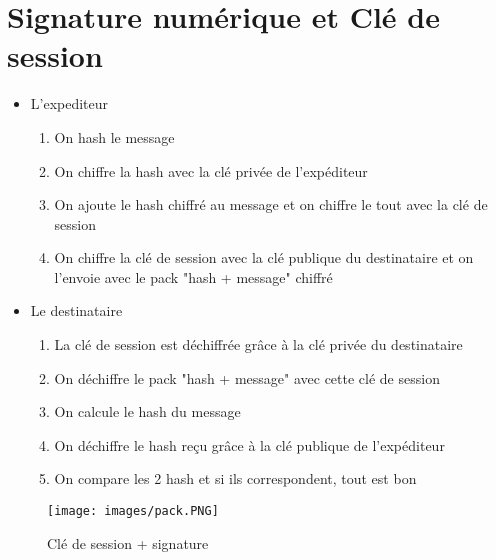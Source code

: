 \documentclass[a4paper]{article}
\begin{document}
\section{Signature numérique et Clé de session}
\begin{itemize}[label=\textbullet, font=\Large]
    \item L'expediteur
    \begin{enumerate}
        \item On hash le message 
        \item On chiffre la hash avec la clé privée de l'expéditeur
        \item On ajoute le hash chiffré au message et on chiffre le tout avec la clé de session
        \item On chiffre la clé de session avec la clé publique du destinataire et on l'envoie avec le pack "hash + message" chiffré
    \end{enumerate}
    \item Le destinataire
    \begin{enumerate}
        \item La clé de session est déchiffrée grâce à la clé privée du destinataire
        \item On déchiffre le pack "hash + message" avec cette clé de session
        \item On calcule le hash du message
        \item On déchiffre le hash reçu grâce à la clé publique de l'expéditeur
        \item On compare les 2 hash et si ils correspondent, tout est bon
    \end{enumerate}    
\end{itemize}
\begin{figure}[H]
    \centering
    \texttt{[image: images/pack.PNG]}
    \caption{Clé de session + signature}
\end{figure}
\end{document}
